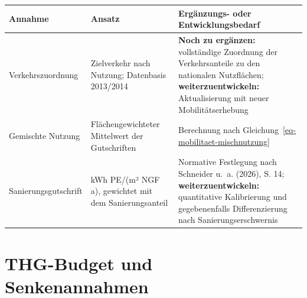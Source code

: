 \documentclass[
  ngerman,
  a4paper,
  DIV=11]{scrreprt}
\newcounter{none} %
\begin{document}
{\def\LTcaptype{none} %
\begin{longtable}[]{@{}
  >{\raggedright\arraybackslash}p{}
  >{\raggedright\arraybackslash}p{}
  >{\raggedright\arraybackslash}p{}@{}}
\toprule\noalign{}
\begin{minipage}[b]{\linewidth}\raggedright
Annahme
\end{minipage} & \begin{minipage}[b]{\linewidth}\raggedright
Ansatz
\end{minipage} & \begin{minipage}[b]{\linewidth}\raggedright
Ergänzungs- oder Entwicklungsbedarf
\end{minipage} \\
\midrule\noalign{}
\endhead
\bottomrule\noalign{}
\endlastfoot
Verkehrszuordnung & Zielverkehr nach Nutzung; Datenbasis 2013/2014 &
\textbf{Noch zu ergänzen:} vollständige Zuordnung der Verkehrsanteile zu
den nationalen Nutzflächen; \textbf{weiterzuentwickeln:} Aktualisierung
mit neuer Mobilitätserhebung \\
Gemischte Nutzung & Flächengewichteter Mittelwert der Gutschriften &
Berechnung nach Gleichung~\ref{eq-mobilitaet-mischnutzung} \\
Sanierungsgutschrift & 15 kWh PE/(m² NGF a), gewichtet mit dem
Sanierungsanteil & Normative Festlegung nach Schneider u.~a. (2026), S.
14; \textbf{weiterzuentwickeln:} quantitative Kalibrierung und
gegebenenfalls Differenzierung nach Sanierungserschwernis \\
\end{longtable}
}

\section{THG-Budget und
Senkenannahmen}\label{thg-budget-und-senkenannahmen}
\end{document}
